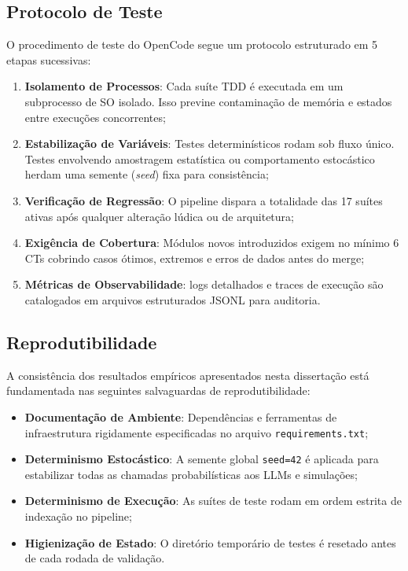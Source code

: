 \documentclass[12pt,a4paper,oneside]{abntex2}
\begin{document}
\subsection{Protocolo de Teste}

O procedimento de teste do OpenCode segue um protocolo estruturado em 5 etapas sucessivas:

\begin{enumerate}
    \item \textbf{Isolamento de Processos}: Cada suíte TDD é executada em um subprocesso de SO isolado. Isso previne contaminação de memória e estados entre execuções concorrentes;
    \item \textbf{Estabilização de Variáveis}: Testes determinísticos rodam sob fluxo único. Testes envolvendo amostragem estatística ou comportamento estocástico herdam uma semente (\textit{seed}) fixa para consistência;
    \item \textbf{Verificação de Regressão}: O pipeline dispara a totalidade das 17 suítes ativas após qualquer alteração lúdica ou de arquitetura;
    \item \textbf{Exigência de Cobertura}: Módulos novos introduzidos exigem no mínimo 6 CTs cobrindo casos ótimos, extremos e erros de dados antes do merge;
    \item \textbf{Métricas de Observabilidade}: logs detalhados e traces de execução são catalogados em arquivos estruturados JSONL para auditoria.
\end{enumerate}

\subsection{Reprodutibilidade}

A consistência dos resultados empíricos apresentados nesta dissertação está fundamentada nas seguintes salvaguardas de reprodutibilidade:

\begin{itemize}
    \item \textbf{Documentação de Ambiente}: Dependências e ferramentas de infraestrutura rigidamente especificadas no arquivo \texttt{requirements.txt};
    \item \textbf{Determinismo Estocástico}: A semente global \texttt{seed=42} é aplicada para estabilizar todas as chamadas probabilísticas aos LLMs e simulações;
    \item \textbf{Determinismo de Execução}: As suítes de teste rodam em ordem estrita de indexação no pipeline;
    \item \textbf{Higienização de Estado}: O diretório temporário de testes é resetado antes de cada rodada de validação.
\end{itemize}
\end{document}
